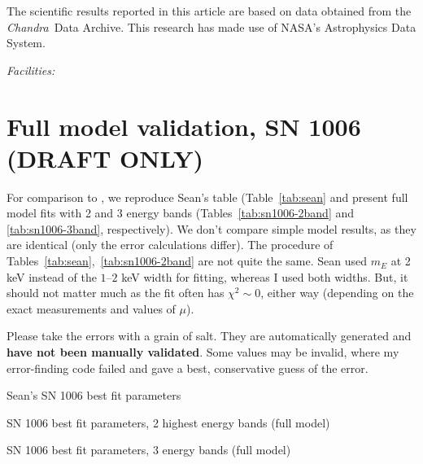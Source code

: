 \documentclass[iop, apj, numberedappendix, twocolappendix]{emulateapj}
\newcommand{\Chandra}{\textit{Chandra}\ }
\begin{document}
The scientific results reported in this article are based on data obtained from
the \Chandra Data Archive.
This research has made use of NASA's Astrophysics Data System.

{\it Facilities:} 

\clearpage

\appendix

\setcounter{table}{0}
\renewcommand{\thetable}{A\arabic{table}}
\setcounter{figure}{0}
\renewcommand{\thefigure}{A\arabic{figure}}

\section{Full model validation, SN 1006 (DRAFT ONLY)}

For comparison to , we reproduce Sean's table
(Table~\ref{tab:sean} and present full model fits with 2 and 3 energy bands
(Tables~\ref{tab:sn1006-2band} and \ref{tab:sn1006-3band}, respectively).
We don't compare simple model results, as they are identical (only the error
calculations differ).
The procedure of Tables~\ref{tab:sean},~\ref{tab:sn1006-2band} are not quite
the same.  Sean used $m_E$ at 2 keV instead of the $1$--$2$ keV width for
fitting, whereas I used both widths.  But, it should not matter much as
the fit often has $\chi^2 \sim 0$, either way (depending on the exact
measurements and values of $\mu$).

Please take the errors with a grain of salt.  They are automatically
generated and \textbf{have not been manually validated}.  Some values may be
invalid, where my error-finding code failed and gave a best, conservative guess
of the error.

\begin{table}[h]
\scriptsize
\centering
\caption{Sean's SN 1006 best fit parameters }
\label{tab:sean}

\end{table}

\begin{table*}[h]
\scriptsize
\centering
\caption{SN 1006 best fit parameters, 2 highest energy bands (full model)}
\label{tab:sn1006-2band}

\end{table*}

\begin{table*}[h]
\scriptsize
\centering
\caption{SN 1006 best fit parameters, 3 energy bands (full model)}
\label{tab:sn1006-3band}

\end{table*}
\end{document}
